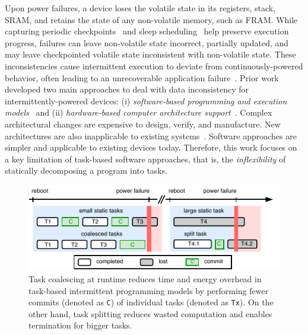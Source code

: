Upon power failures, a device loses the volatile
state in its registers, stack, SRAM, and retains the state of any non-volatile
memory, such as FRAM. While capturing periodic
checkpoints~\cite{mementos,quickrecall} and sleep
scheduling~\cite{dewdrop,hibernus,hibernusplusplus} help preserve execution
progress, failures can leave non-volatile state incorrect, partially updated,
and may leave checkpointed volatile state inconsistent with non-volatile state.
These inconsistencies cause intermittent execution to deviate from
continuously-powered behavior, often leading to an unrecoverable
application failure~\cite{dino,edb}. Prior work developed two main approaches to deal with data inconsistency for
intermittently-powered devices: (i) \emph{software-based programming and
execution models}~\cite{dino,ratchet,chain,alpaca} and (ii)
\emph{hardware-based computer architecture
support}~\cite{hicks_isca_2017,idetic,nvp}. Complex architectural changes are
expensive to design, verify, and manufacture. New architectures are also
inapplicable to existing systems~\cite{hicks_isca_2017,nvp}. Software
approaches are simpler and applicable to existing devices today. Therefore, this work focuses on a key limitation of task-based software approaches, that is, the {\em inflexibility} of statically decomposing a program into tasks.

%
\begin{figure}
    \centering
    \includegraphics[width=\columnwidth]{figures/intro-figure-v3.pdf}
    \caption{ Task coalescing at runtime reduces time and energy overhead in task-based intermittent programming models by performing fewer commits (denoted as \texttt{C}) of individual tasks (denoted as \texttt{Tx}). On the other hand, task splitting reduces wasted computation and enables termination for bigger tasks.}
    \label{fig:coalesce}
\end{figure}
%

